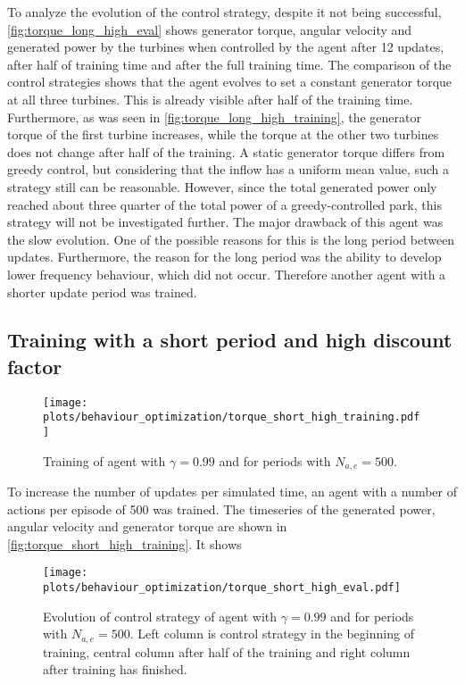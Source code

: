 To analyze the evolution of the control strategy, despite it not being successful, \autoref{fig:torque_long_high_eval} shows generator torque, angular velocity and generated power by the turbines when controlled by the agent after 12 updates, after half of training time and after the full training time. The comparison of the control strategies shows that the agent evolves to set a constant generator torque at all three turbines. This is already visible after half of the training time. Furthermore, as was seen in \autoref{fig:torque_long_high_training}, the generator torque of the first turbine increases, while the torque at the other two turbines does not change after half of the training. A static generator torque differs from greedy control, but considering that the inflow has a uniform mean value, such a strategy still can be reasonable. However, since the total generated power only reached about three quarter of the total power of a greedy-controlled park, this strategy will not be investigated further. The major drawback of this agent was the slow evolution. One of the possible reasons for this is the long period between updates. Furthermore, the reason for the long period was the ability to develop lower frequency behaviour, which did not occur. Therefore another agent with a shorter update period was trained.
\subsection{Training with a short period and high discount factor}
\begin{figure}[h]
	\centering
	\texttt{[image: plots/behaviour\_optimization/torque\_short\_high\_training.pdf]}
	\caption{ Training of agent with $\gamma=0.99$ and for periods with $N_{a,e}=500$.}
	\label{fig:torque_short_high_training}
\end{figure}
To increase the number of updates per simulated time, an agent with a number of actions per episode of 500 was trained. The timeseries of the generated power, angular velocity and generator torque are shown in \autoref{fig:torque_short_high_training}. It shows 
\begin{figure}[h]
	\centering
	\texttt{[image: plots/behaviour\_optimization/torque\_short\_high\_eval.pdf]}
	\caption{ Evolution of control strategy of agent with $\gamma=0.99$ and for periods with $N_{a,e}=500$. Left column is control strategy in the beginning of training, central column after half of the training and right column after training has finished.}
	\label{fig:torque_short_high_eval}
\end{figure}
